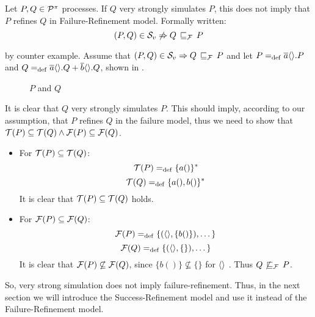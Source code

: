 \begin{rem}
\label{cor_sim_failure_refinement}
Let $P,Q\in\mathcal P^{\pi}$ processes. If $Q$ very strongly simulates $P$, this does not imply that $P$ refines $Q$ in Failure-Refinement model. Formally written:
    \[(P,Q)\in{}\simuv  \not\Rightarrow Q \refiF P\]
\end{rem}%
\begin{prf}
by counter example. Assume that $(P,Q)\in{}\simuv \Rightarrow Q \refiF P$ and let $P=_{\mathrm{def}}\overline{a}\langle\rangle.P$ and $Q=_{\mathrm{def}}\overline{a}\langle\rangle.Q + \overline{b}\langle\rangle.Q$, shown in .
\begin{figure}[H]%
\centering
{}%
\qquad
{}%
\caption{$P$ and $Q$}
\label{vm_and_vmHalf}
\end{figure}

It is clear that $Q$ very strongly simulates $P$. This should imply, according to our assumption, that $P$ refines $Q$ in the failure model, thus we need to show that $\Traces[P]\subseteq\Traces[Q] \wedge \Failures[P]\subseteq\Failures[Q]$.
\begin{itemize}
\item For $\Traces[P]\subseteq\Traces[Q]$:
    \[\Traces[P] \define \{a()\}^\ast\]
    \[\Traces[Q] \define \{a(),b()\}^\ast\]
It is clear that $\Traces[P]\subseteq\Traces[Q]$ holds. 
\item For $\Failures[P]\subseteq\Failures[Q]$:
    \[\Failures[P] \define \{(\out{}{},\{b()\}),\dots\}\]
    \[\Failures[Q] \define \{(\out{}{},\{\}),\dots\}\]
It is clear that $\Failures[P]\not\subseteq\Failures[Q]$, since $\{b()\} \not\subseteq \{\}$ for $\overline{}\langle\rangle$ . Thus $Q \not\refiF P$.
\end{itemize}
So, very strong simulation does not imply failure-refinement. Thus, in the next section we will introduce the Success-Refinement model and use it instead of the Failure-Refinement model.
\end{prf}